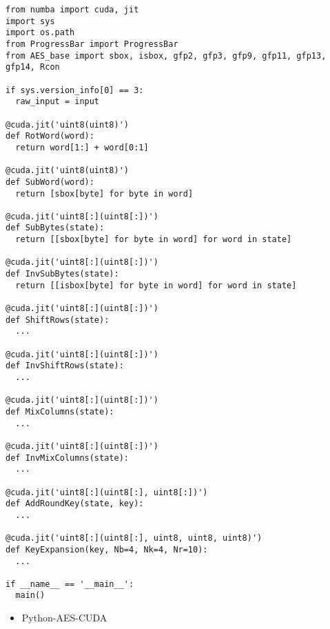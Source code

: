 \begin{verbatim}
from numba import cuda, jit
import sys
import os.path
from ProgressBar import ProgressBar
from AES_base import sbox, isbox, gfp2, gfp3, gfp9, gfp11, gfp13, gfp14, Rcon

if sys.version_info[0] == 3:
  raw_input = input

@cuda.jit('uint8(uint8)')
def RotWord(word):
  return word[1:] + word[0:1]

@cuda.jit('uint8(uint8)')
def SubWord(word):
  return [sbox[byte] for byte in word]

@cuda.jit('uint8[:](uint8[:])')
def SubBytes(state):
  return [[sbox[byte] for byte in word] for word in state]

@cuda.jit('uint8[:](uint8[:])')
def InvSubBytes(state):
  return [[isbox[byte] for byte in word] for word in state]

@cuda.jit('uint8[:](uint8[:])')
def ShiftRows(state):
  ...

@cuda.jit('uint8[:](uint8[:])')
def InvShiftRows(state):
  ...

@cuda.jit('uint8[:](uint8[:])')
def MixColumns(state):
  ...

@cuda.jit('uint8[:](uint8[:])')
def InvMixColumns(state):
  ...

@cuda.jit('uint8[:](uint8[:], uint8[:])')
def AddRoundKey(state, key):
  ...

@cuda.jit('uint8[:](uint8[:], uint8, uint8, uint8)')
def KeyExpansion(key, Nb=4, Nk=4, Nr=10):
  ...

if __name__ == '__main__':
  main()
\end{verbatim}

\begin{itemize}
  \item Python-AES-CUDA
\end{itemize}
